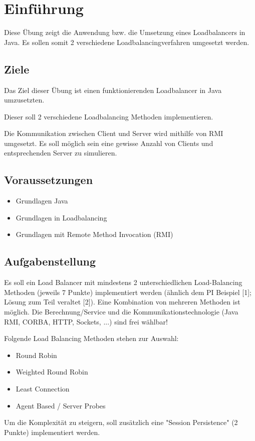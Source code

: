 
\section{Einführung}
Diese Übung zeigt die Anwendung bzw. die Umsetzung eines Loadbalancers in Java.
Es sollen somit 2 verschiedene Loadbalancingverfahren umgesetzt werden.

\subsection{Ziele}
Das Ziel dieser Übung ist einen funktionierenden Loadbalancer in Java umzusetzten.

Dieser soll 2 verschiedene Loadbalancing Methoden implementieren.

Die Kommunikation zwischen Client und Server wird mithilfe von RMI umgesetzt.
Es soll möglich sein eine gewisse Anzahl von Clients und entsprechenden Server zu simulieren.
\subsection{Voraussetzungen}
\begin{itemize}
	\item Grundlagen Java
	\item Grundlagen in Loadbalancing
	\item Grundlagen mit Remote Method Invocation (RMI)
\end{itemize}

\subsection{Aufgabenstellung}
Es soll ein Load Balancer mit mindestens 2 unterschiedlichen Load-Balancing Methoden (jeweils 7 Punkte) implementiert werden (ähnlich dem PI Beispiel [1]; Lösung zum Teil veraltet [2]). Eine Kombination von mehreren Methoden ist möglich. Die Berechnung/Service und die Kommunikationstechnologie (Java RMI, CORBA, HTTP, Sockets, ...) sind frei wählbar!

Folgende Load Balancing Methoden stehen zur Auswahl:

\begin{itemize}
	\item Round Robin
	\item Weighted Round Robin
	\item Least Connection
	\item Agent Based / Server Probes
\end{itemize}

Um die Komplexität zu steigern, soll zusätzlich eine "Session Persistence" (2 Punkte) implementiert werden.
\clearpage
